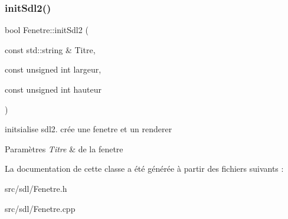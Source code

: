 \subsubsection{\texorpdfstring{init\+Sdl2()}{initSdl2()}}
{\footnotesize\ttfamily bool Fenetre\+::init\+Sdl2 (\begin{DoxyParamCaption}\item[{const std\+::string \&}]{Titre,  }\item[{const unsigned int}]{largeur,  }\item[{const unsigned int}]{hauteur }\end{DoxyParamCaption})\hspace{0.3cm}{\ttfamily [protected]}}



initsialise sdl2. crée une fenetre et un renderer 


\begin{DoxyParams}{Paramètres}
{\em Titre} & de la fenetre \\
\hline
\end{DoxyParams}


La documentation de cette classe a été générée à partir des fichiers suivants \+:\begin{DoxyCompactItemize}
\item 
src/sdl/Fenetre.\+h\item 
src/sdl/Fenetre.\+cpp\end{DoxyCompactItemize}
